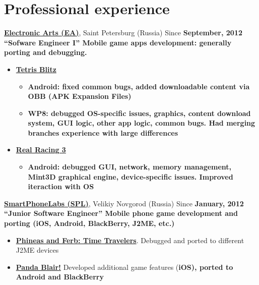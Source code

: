 \section{Professional experience}
{
\fontsize{14pt}{12pt}\selectfont
\href{http://www.ea.com}{\bfseries Electronic Arts (EA)\mdseries},
Saint Petersburg (Russia)
}
\subitem Since \bfseries September, 2012 \mdseries ``Sofware Engineer I''
\subitem Mobile game apps development: generally porting and debugging.
\begin{itemize}
\setlength{\itemindent}{20pt}
\item
    \href{https://play.google.com/store/apps/details?id=com.ea.tetrisblitz_row}
        {\bfseries Tetris Blitz \mdseries}
    \begin{itemize}
        \item \bfseries Android\mdseries:
        fixed common bugs,
        added downloadable content via OBB (APK Expansion Files)
    \end{itemize}
    \begin{itemize}
        \item \bfseries WP8\mdseries:
        debugged OS-specific issues,
        graphics,
        content download system,
        GUI logic,
        other app logic,
        common bugs.
        Had merging branches experience with large differences
    \end{itemize}
\item
    \href{http://www.facebook.com/realracing}
    {\bfseries Real Racing 3\mdseries}
    \begin{itemize}
        \item\bfseries Android\mdseries:
        debugged
        GUI,
        network,
        memory management,
        Mint3D graphical engine,
        device-specific issues.
        Improved iteraction with OS
    \end{itemize}
\end{itemize}

{
\vspace{15pt}
\fontsize{14pt}{12pt}\selectfont
\href{http://spl.co}{\bfseries SmartPhoneLabs (SPL)\mdseries},
Velikiy Novgorod (Russia)
}
\subitem Since \bfseries January, 2012 \mdseries ``Junior Software Engineer''
\subitem Mobile phone game development and porting
(iOS, Android, BlackBerry, J2ME, etc.)
\begin{itemize}
\setlength{\itemindent}{20pt}
\item
    \href{http://java.mob.org/game/phineas\_and\_ferb\_time\_travelers.html}
        {\bfseries Phineas and Ferb: Time Travelers\mdseries}.
        Debugged and ported to different J2ME devices
\item
    \href{https://itunes.apple.com/us/app/panda-blair!/id500995558?mt=8}
        {\bfseries Panda Blair!\mdseries}
        Developed additional game features (\bfseries iOS\mdseries),
        ported to \bfseries Android \mdseries and \bfseries BlackBerry\mdseries
\end{itemize}


